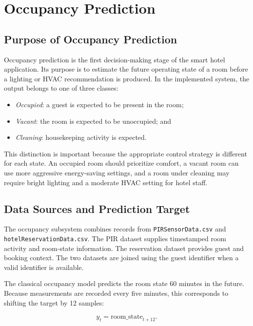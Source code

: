 \chapter{Occupancy Prediction}
\label{chap:occupancy-prediction}

\section{Purpose of Occupancy Prediction}

Occupancy prediction is the first decision-making stage of the smart hotel
application. Its purpose is to estimate the future operating state of a room
before a lighting or HVAC recommendation is produced. In the implemented
system, the output belongs to one of three classes:

\begin{itemize}
    \item \textit{Occupied}: a guest is expected to be present in the room;
    \item \textit{Vacant}: the room is expected to be unoccupied; and
    \item \textit{Cleaning}: housekeeping activity is expected.
\end{itemize}

This distinction is important because the appropriate control strategy is
different for each state. An occupied room should prioritize comfort, a vacant
room can use more aggressive energy-saving settings, and a room under cleaning
may require bright lighting and a moderate HVAC setting for hotel staff.

\section{Data Sources and Prediction Target}

The occupancy subsystem combines records from
\texttt{PIRSensorData.csv} and \texttt{hotelReservationData.csv}. The PIR
dataset supplies timestamped room activity and room-state information. The
reservation dataset provides guest and booking context. The two datasets are
joined using the guest identifier when a valid identifier is available.

The classical occupancy model predicts the room state 60 minutes in the
future. Because measurements are recorded every five minutes, this corresponds
to shifting the target by 12 samples:

\[
    y_t = \mathrm{room\_state}_{t+12}.
\]

